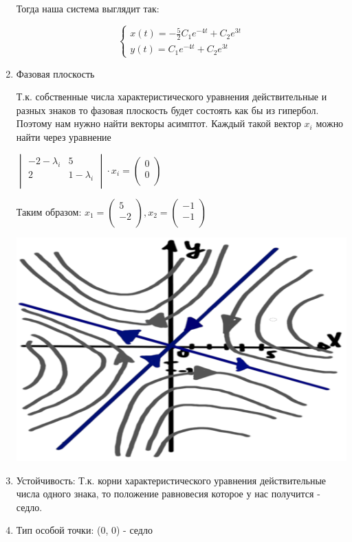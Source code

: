 \begin{enumerate}
    Тогда наша система выглядит так:

    \begin{equation*}
        \begin{cases}
            x(t) = -\frac{5}{2} C_1 e^{-4t} + C_2 e^{3t}
            \\
            y(t) = C_1 e^{-4t} + C_2 e^{3t}
        \end{cases}
    \end{equation*}


    \item Фазовая плоскость

    Т.к. собственные числа характеристического уравнения действительные и разных знаков то фазовая плоскость будет состоять
    как бы из гипербол. Поэтому нам нужно найти векторы асимптот. Каждый такой вектор $x_i$ можно найти через уравнение

    $\displaystyle \begin{vmatrix}
                       -2 - \lambda_i & 5             \\
                       2              & 1 - \lambda_i \\
    \end{vmatrix} \cdot x_i =
    \begin{pmatrix}
        0 \\
        0 \\
    \end{pmatrix}
    $

    Таким образом: $
    x_1 =
    \begin{pmatrix}
        5  \\
        -2 \\
    \end{pmatrix} ,
    x_2 =
    \begin{pmatrix}
        -1 \\
        -1 \\
    \end{pmatrix}
    $

    \includegraphics[scale=0.2]{images/4a1}

    \item Устойчивость: Т.к. корни характеристического уравнения действительные числа одного знака, то
    положение равновесия которое у нас получится - седло.
    \item Тип особой точки: (0, 0) - седло
\end{enumerate}

